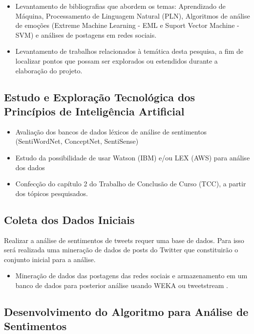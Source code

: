 \documentclass[
	12pt,				%
	openright,			%
	oneside,			%
	a4paper,			%
	english,			%
	spanish,			%
	brazil				%
	]{abntex2}
\begin{document}
				\begin{itemize}
					\item Levantamento de bibliografias que abordem os temas:  Aprendizado de Máquina, Processamento de Linguagem Natural (PLN), Algoritmos de análise de emoções (Extreme Machine Learning - EML e Suport Vector Machine - SVM) e análises de postagens em redes sociais.
					\item Levantamento de trabalhos relacionados à temática desta pesquisa, a fim de localizar pontos que possam ser explorados ou estendidos durante a elaboração do projeto.
					
				\end{itemize}
				
		\subsection*{Estudo e Exploração Tecnológica dos Princípios de Inteligência Artificial }
				
				\begin{itemize} 
					\item Avaliação dos bancos de dados léxicos de análise de sentimentos (SentiWordNet, ConceptNet, SentiSense)
					\item Estudo da possibilidade de usar Watson (IBM) e/ou LEX (AWS) para análise dos dados
					\item Confecção do capítulo 2 do Trabalho de Conclusão de Curso (TCC), a partir dos tópicos pesquisados.
				\end{itemize}			
				
		\subsection*{Coleta dos Dados Iniciais}
		Realizar a análise de sentimentos de tweets requer uma base de dados. Para isso será realizada uma mineração de dados de posts do Twitter que constituirão o conjunto inicial para a análise.
		 
				\begin{itemize}
					\item Mineração de dados das postagens das redes sociais e armazenamento em um banco de dados para posterior análise usando WEKA \cite{article_weka} ou tweetstream \cite{tweetstream}.
				\end{itemize}
				
		\subsection*{Desenvolvimento do Algoritmo para Análise de Sentimentos}				
\end{document}
